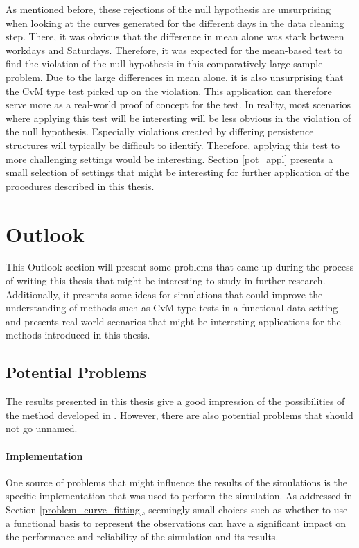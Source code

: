 \documentclass[12pt, a4paper]{article}
\theoremstyle{MAstyle} \newtheorem{assumption}{Assumption}[section]
\theoremstyle{MAstyle} \newtheorem{definition}{Definition}[section]
\theoremstyle{MAstyle} \newtheorem{theorem}{Theorem}[section]
\begin{document}
			As mentioned before, these rejections of the null hypothesis are unsurprising when looking at the curves generated for the different days in the data cleaning step. There, it was obvious that the difference in mean alone was stark between workdays and Saturdays. Therefore, it was expected for the mean-based test to find the violation of the null hypothesis in this comparatively large sample problem. Due to the large differences in mean alone, it is also unsurprising that the CvM type test picked up on the violation.
			This application can therefore serve more as a real-world proof of concept for the test. In reality, most scenarios where applying this test will be interesting will be less obvious in the violation of the null hypothesis. Especially violations created by differing persistence structures will typically be difficult to identify. Therefore, applying this test to more challenging settings would be interesting. Section \ref{pot_appl} presents a small selection of settings that might be interesting for further application of the procedures described in this thesis.
	
	\section{Outlook}\label{Outlook}
		This Outlook section will present some problems that came up during the process of writing this thesis that might be interesting to study in further research. Additionally, it presents some ideas for simulations that could improve the understanding of methods such as CvM type tests in a functional data setting and presents real-world scenarios that might be interesting applications for the methods introduced in this thesis.
		
		\newpage
		\subsection{Potential Problems}
			The results presented in this thesis give a good impression of the possibilities of the method developed in \cite{bugni_permutation_2021}. However, there are also potential problems that should not go unnamed.
			
			\paragraph{Implementation\\}
				One source of problems that might influence the results of the simulations is the specific implementation that was used to perform the simulation. As addressed in Section \ref{problem_curve_fitting}, seemingly small choices such as whether to use a functional basis to represent the observations can have a significant impact on the performance and reliability of the simulation and its results.
				
\end{document}
